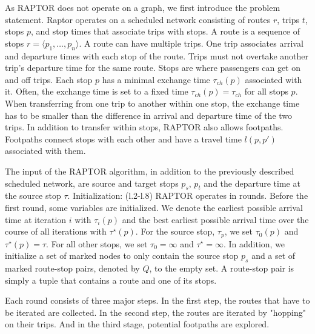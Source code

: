 As RAPTOR does not operate on a graph, we first introduce the problem statement.
Raptor operates on a scheduled network consisting of routes \(r\), trips \(t\), stops \(p\), and stop times that associate trips with stops.
A route is a sequence of stops \(r = \langle p_1, \dots, p_n \rangle\).
A route can have multiple trips.
One trip associates arrival and departure times with each stop of the route.
Trips must not overtake another trip's departure time for the same route.
Stops are where passengers can get on and off trips.
Each stop \(p\) has a minimal exchange time \(\tau_{ch}(p)\) associated with it.
Often, the exchange time is set to a fixed time \(\tau_{ch}(p) = \tau_{ch}\) for all stops \(p\).
When transferring from one trip to another within one stop, the exchange time has to be smaller than the difference in arrival and departure time of the two trips.
In addition to transfer within stops, RAPTOR also allows footpaths.
Footpaths connect stops with each other and have a travel time \(l(p, p')\) associated with them.

The input of the RAPTOR algorithm, in addition to the previously described scheduled network, are source and target stops \(p_s\), \(p_t\) and the departure time at the source stop \(\tau\).
Initialization: (l.2-l.8)
RAPTOR operates in rounds. Before the first round, some variables are initialized.
We denote the earliest possible arrival time at iteration \(i\) with \(\tau_i(p)\) and the best earliest possible arrival time over the course of all iterations with \(\tau^\star(p)\). For the source stop, \(\tau_p\), we set \(\tau_0(p)\) and \(\tau^\star(p) = \tau\). For all other stops, we set \(\tau_0 = \infty\) and \(\tau^\star = \infty\).
In addition, we initialize a set of marked nodes to only contain the source stop \(p_s\) and a set of marked route-stop pairs, denoted by \(Q\), to the empty set. A route-stop pair is simply a tuple that contains a route and one of its stops.

Each round consists of three major steps. In the first step, the routes that have to be iterated are collected. In the second step, the routes are iterated by "hopping" on their trips. And in the third stage, potential footpaths are explored.

